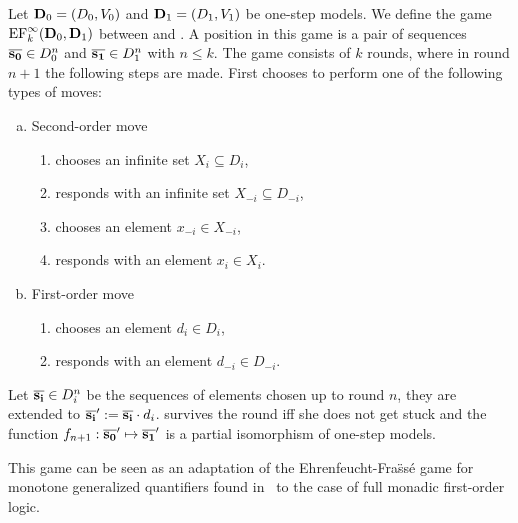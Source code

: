 \begin{definition}
	Let $\mathbf{D}_0 = (D_0,V_0)$ and $\mathbf{D}_1 = (D_1,V_1)$ be one-step models. We define the game $\mathrm{EF}^\infty_k(\mathbf{D}_0,\mathbf{D}_1)$ between \abelard and \eloise. A position in this game is a pair of sequences $\overline{{\mathbf{s_0}}} \in D_0^n$ and $\overline{{\mathbf{s_1}}} \in D_1^n$ with $n \leq k$. The game consists of $k$ rounds, where in round $n+1$ the following steps are made. First \abelard chooses to perform one of the following types of moves:
	\begin{enumerate}[(a)]
		 pt
		 pt
		\item Second-order move
		\begin{enumerate}[1.]
			 pt
			 pt
			\item \abelard chooses an infinite set $X_i \subseteq D_i$,
			\item \eloise responds with an infinite set $X_{-i} \subseteq D_{-i}$,
			\item \abelard chooses an element $x_{-i} \in X_{-i}$,
			\item \eloise responds with an element $x_i \in X_i$.
		\end{enumerate}
		\item First-order move
		\begin{enumerate}[1.]
			 pt
			 pt
			\item \abelard chooses an element $d_i \in D_i$,
			\item \eloise responds with an element $d_{-i} \in D_{-i}$.
		\end{enumerate}
	\end{enumerate}
	Let $\overline{{\mathbf{s_i}}} \in D_i^n$ be the sequences of elements chosen up to round $n$, they are extended to ${\overline{{\mathbf{s_i}}}' := \overline{{\mathbf{s_i}}}\cdot d_i}$. \eloise survives the round iff she does not get stuck and the function $f_{n+1}: \overline{{\mathbf{s_0}}}' \mapsto \overline{{\mathbf{s_1}}}'$ is a partial isomorphism of one-step models.
\end{definition}

This game can be seen as an adaptation of the Ehrenfeucht-Fra\"ss\'e game for monotone generalized quantifiers found in~\cite{Kolaitis199523} to the case of full monadic first-order logic. %


